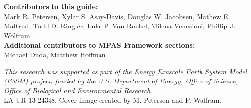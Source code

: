 \vspace{8pt}
\noindent
{\bf Contributors to this guide:}\\
Mark R. Petersen, Xylar S. Asay-Davis, 
Douglas W. Jacobsen, Mathew E. Maltrud, Todd D. Ringler,
Luke P. Van Roekel, Milena Veneziani,
Phillip J. Wolfram
\\
{\bf Additional contributors to MPAS Framework sections:}\\
Michael Duda, Matthew Hoffman

\vspace{8pt}
\noindent
{\scriptsize
{\it This research was supported as part of the Energy Exascale Earth System Model
(E3SM) project, funded by the U.S. Department of Energy, Office of Science,
Office of Biological and Environmental Research.
} \\
LA-UR-13-24348. Cover image created by M. Petersen and P. Wolfram.}





